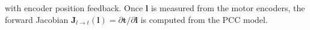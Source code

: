 with encoder position feedback. Once $\mathbf{l}$ is measured from the motor encoders, the forward Jacobian $\mathbf{J}_{l \to t}(\mathbf{l}) = \partial \mathbf{t} / \partial \mathbf{l}$ is computed from the PCC model.
